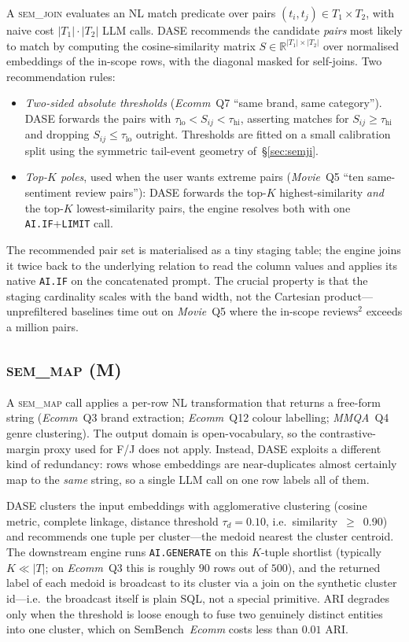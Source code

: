 A \textsc{sem\_join} evaluates an NL match predicate over pairs
$(t_i,t_j)\!\in\!T_1\!\times\!T_2$, with naive cost
$|T_1|\!\cdot\!|T_2|$ LLM calls. DASE recommends the candidate \emph{pairs}
most likely to match by computing the cosine-similarity matrix
$S\in\mathbb{R}^{|T_1|\times|T_2|}$ over normalised embeddings of the
in-scope rows, with the diagonal masked for self-joins. Two
recommendation rules:
\begin{itemize}
\item \emph{Two-sided absolute thresholds} (\emph{Ecomm}~Q7 ``same
  brand, same category''). DASE forwards the pairs with
  $\tau_{\mathrm{lo}}{<}S_{ij}{<}\tau_{\mathrm{hi}}$, asserting matches
  for $S_{ij}\!\geq\!\tau_{\mathrm{hi}}$ and dropping
  $S_{ij}\!\leq\!\tau_{\mathrm{lo}}$ outright. Thresholds are fitted on
  a small calibration split using the symmetric tail-event geometry
  of~\S\ref{sec:semji}.
\item \emph{Top-$K$ poles}, used when the user wants extreme pairs
  (\emph{Movie}~Q5 ``ten same-sentiment review pairs''): DASE forwards
  the top-$K$ highest-similarity \emph{and} the top-$K$
  lowest-similarity pairs, the engine resolves both with one
  \texttt{AI.IF}+\texttt{LIMIT} call.
\end{itemize}
The recommended pair set is materialised as a tiny staging table; the
engine joins it twice back to the underlying relation to read the
column values and applies its native \texttt{AI.IF} on the concatenated
prompt. The crucial property is that the staging cardinality scales
with the band width, not the Cartesian product---unprefiltered baselines
time out on \emph{Movie}~Q5 where the in-scope $\mathrm{reviews}^2$
exceeds a million pairs.

\subsection{\textsc{sem\_map} (M)}

A \textsc{sem\_map} call applies a per-row NL transformation that
returns a free-form string (\emph{Ecomm}~Q3 brand extraction;
\emph{Ecomm}~Q12 colour labelling; \emph{MMQA}~Q4 genre clustering). The
output domain is open-vocabulary, so the contrastive-margin proxy used
for F/J does not apply. Instead, DASE exploits a different kind of
redundancy: rows whose embeddings are near-duplicates almost certainly
map to the \emph{same} string, so a single LLM call on one row labels
all of them.

DASE clusters the input embeddings with agglomerative clustering
(cosine metric, complete linkage, distance threshold $\tau_d{=}0.10$,
i.e.\ similarity~$\geq$~0.90) and recommends one tuple per cluster---the
medoid nearest the cluster centroid. The downstream engine runs
\texttt{AI.GENERATE} on this $K$-tuple shortlist (typically $K\!\ll\!|T|$;
on \emph{Ecomm}~Q3 this is roughly $90$ rows out of $500$), and the
returned label of each medoid is broadcast to its cluster via a join on
the synthetic cluster id---i.e.\ the broadcast itself is plain SQL,
not a special primitive. ARI degrades only when the threshold is loose
enough to fuse two genuinely distinct entities into one cluster, which
on SemBench~\emph{Ecomm} costs less than $0.01$ ARI.

